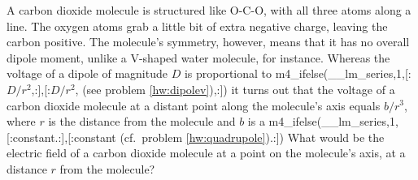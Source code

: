 A carbon dioxide molecule is structured like O-C-O, with all three
atoms along a line. The oxygen atoms grab a little bit of extra
negative charge, leaving the carbon positive.  The molecule's
symmetry, however, means that it has no overall dipole moment, unlike
a V-shaped water molecule, for instance.  Whereas the voltage of a
dipole of magnitude $D$ is proportional to 
m4_ifelse(__lm_series,1,[:$D/r^2$,:],[:$D/r^2$, (see problem \ref{hw:dipolev}),:])
it turns out that the voltage of a carbon dioxide
molecule at a distant point along the molecule's axis equals $b/r^3$,
where $r$ is the distance from the molecule and $b$ is a
m4_ifelse(__lm_series,1,[:constant.:],[:constant (cf.~problem \ref{hw:quadrupole}).:])
What would be the electric field of a
carbon dioxide molecule at a point on the molecule's axis, at a
distance $r$ from the molecule?\answercheck

